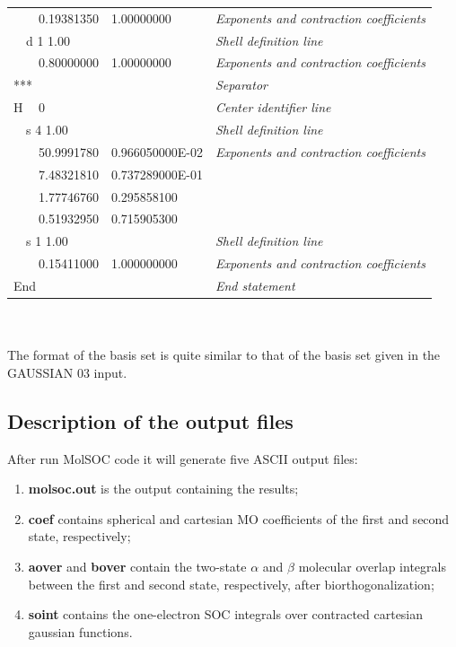 \documentclass[a4paper,12pt]{article}
\begin{document}
\begin{tabular}{lllll}
 &   & 0.19381350 &  1.00000000        &  {\em Exponents and contraction coefficients} \\
 & \multicolumn{3}{l}{d \hspace{0.5 cm}  1  \hspace{0.5 cm} 1.00}  & {\em Shell definition line} \\
 &   & 0.80000000 &  1.00000000        &  {\em Exponents and contraction coefficients} \\
 \multicolumn{4}{l}{***} & {\em Separator} \\
\multicolumn{2}{l}{H} & \multicolumn{2}{l}{0} & {\em Center identifier line} \\
 & \multicolumn{3}{l}{s \hspace{0.5 cm}  4  \hspace{0.5 cm} 1.00}  & {\em Shell definition line} \\
 &   & 50.9991780 &  0.966050000E-02   &  {\em Exponents and contraction coefficients} \\
 &   & 7.48321810 &  0.737289000E-01   &          \\
 &   & 1.77746760 &  0.295858100       &          \\
 &   & 0.51932950 &  0.715905300       &          \\
 & \multicolumn{3}{l}{s \hspace{0.5 cm}  1  \hspace{0.5 cm} 1.00}  & {\em Shell definition line} \\
 &   & 0.15411000 &  1.000000000       &  {\em Exponents and contraction coefficients} \\
 \multicolumn{4}{l}{End} & {\em End statement}
\end{tabular} \\ \\
The format of the basis set is quite similar to that of the basis set given in the {\sf GAUSSIAN 03} input.
%
\subsection{Description of the output files}
After run {\sf MolSOC} code it will generate five ASCII output files:
\begin{enumerate}
\renewcommand{\labelenumi}{(\roman{enumi})}
\item {\bf molsoc.out} is the output containing the results;
\item {\bf coef} contains spherical and cartesian MO coefficients of the
first and second state, respectively;
\item {\bf aover} and {\bf bover} contain the two-state $\alpha$ and $\beta$ molecular overlap
integrals between the first and second state, respectively, after biorthogonalization;
\item {\bf soint} contains the one-electron SOC integrals over contracted
cartesian gaussian functions.
\end{enumerate}
%
\end{document}
